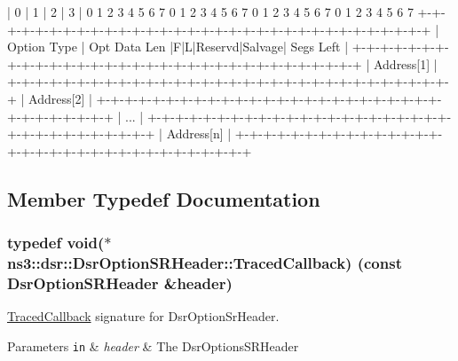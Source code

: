 \begin{DoxyVerb} |      0        |      1        |      2        |      3        |
 0 1 2 3 4 5 6 7 0 1 2 3 4 5 6 7 0 1 2 3 4 5 6 7 0 1 2 3 4 5 6 7
 +-+-+-+-+-+-+-+-+-+-+-+-+-+-+-+-+-+-+-+-+-+-+-+-+-+-+-+-+-+-+-+-+
 |  Option Type |  Opt Data Len |F|L|Reservd|Salvage|  Segs Left |
 +-+-+-+-+-+-+-+-+-+-+-+-+-+-+-+-+-+-+-+-+-+-+-+-+-+-+-+-+-+-+-+-+
 |                            Address[1]                         |
 +-+-+-+-+-+-+-+-+-+-+-+-+-+-+-+-+-+-+-+-+-+-+-+-+-+-+-+-+-+-+-+-+
 |                            Address[2]                         |
 +-+-+-+-+-+-+-+-+-+-+-+-+-+-+-+-+-+-+-+-+-+-+-+-+-+-+-+-+-+-+-+-+
 |                               ...                             |
 +-+-+-+-+-+-+-+-+-+-+-+-+-+-+-+-+-+-+-+-+-+-+-+-+-+-+-+-+-+-+-+-+
 |                            Address[n]                         |
 +-+-+-+-+-+-+-+-+-+-+-+-+-+-+-+-+-+-+-+-+-+-+-+-+-+-+-+-+-+-+-+-+
\end{DoxyVerb}
 

\subsection{Member Typedef Documentation}
\subsubsection[{\texorpdfstring{Traced\+Callback}{TracedCallback}}]{\setlength{\rightskip}{0pt plus 5cm}typedef void($\ast$  ns3\+::dsr\+::\+Dsr\+Option\+S\+R\+Header\+::\+Traced\+Callback) (const {\bf Dsr\+Option\+S\+R\+Header} \&header)}\hypertarget{classns3_1_1dsr_1_1DsrOptionSRHeader_a7c615275ccf9149efdcff91c5053dc90}{}\label{classns3_1_1dsr_1_1DsrOptionSRHeader_a7c615275ccf9149efdcff91c5053dc90}
\hyperlink{classns3_1_1TracedCallback}{Traced\+Callback} signature for Dsr\+Option\+Sr\+Header.


\begin{DoxyParams}[1]{Parameters}
\mbox{\tt in}  & {\em header} & The Dsr\+Options\+S\+R\+Header \\
\hline
\end{DoxyParams}
